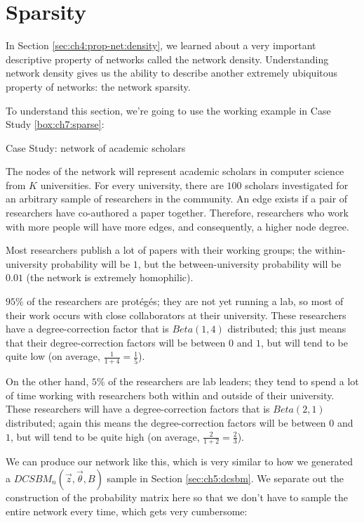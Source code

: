 \section{Sparsity}
\label{sec:ch7:sparse}

In Section \ref{sec:ch4:prop-net:density}, we learned about a very important descriptive property of networks called the network density. Understanding network density gives us the ability to describe another extremely ubiquitous property of networks: the network sparsity. 


To understand this section, we're going to use the working example in Case Study \ref{box:ch7:sparse}:

\begin{floatingbox}[h]\caption{Case Study: network of academic scholars}
\label{box:ch7:sparse}
The nodes of the network will represent academic scholars in computer science from $K$ universities. For every university, there are $100$ scholars investigated for an arbitrary sample of researchers in the community. An edge exists if a pair of researchers have co-authored a paper together. Therefore, researchers who work with more people will have more edges, and consequently, a higher node degree.

Most researchers publish a lot of papers with their working groups; the within-university probability will be $1$, but the between-university probability will be $0.01$ (the network is extremely homophilic).

$95\%$ of the researchers are prot\'eg\'es; they are not yet running a lab, so most of their work occurs with close collaborators at their university. These researchers have a degree-correction factor that is $Beta(1, 4)$ distributed; this just means that their degree-correction factors will be between $0$ and $1$, but will tend to be quite low (on average, $\frac{1}{1 + 4} = \frac{1}{5}$). 

On the other hand, $5\%$ of the researchers are lab leaders; they tend to spend a lot of time working with researchers both within and outside of their university. These researchers will have a degree-correction factors that is $Beta(2, 1)$ distributed; again this means the degree-correction factors will be between $0$ and $1$, but will tend to be quite high (on average, $\frac{2}{1 + 2} = \frac{2}{3}$).
\end{floatingbox}


We can produce our network like this, which is very similar to how we generated a $DCSBM_n(\vec z, \vec \theta, B)$ sample in Section \ref{sec:ch5:dcsbm}. We separate out the construction of the probability matrix here so that we don't have to sample the entire network every time, which gets very cumbersome:

